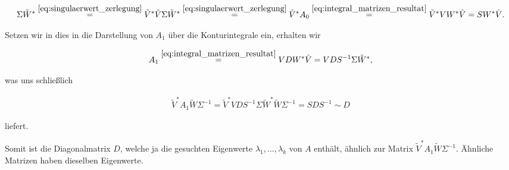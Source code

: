 \begin{align*}
    \Sigma \tilde W^\ast
    \stackrel
    {\eqref{eq:singulaerwert_zerlegung}}{=}
    \tilde V^\ast \tilde V \Sigma \tilde W^\ast
    \stackrel
    {
        \eqref{eq:singulaerwert_zerlegung}
    }{=}
    \tilde V^\ast A_0
    \stackrel
    {
        \eqref{eq:integral_matrizen_resultat}
    }{=}
    \tilde V^\ast V W^\ast \hat V
    =
    S W^\ast \hat V.
\end{align*}

Setzen wir in dies in die Darstellung von $A_1$ über die Konturintegrale ein, erhalten wir

\begin{align*}
    A_1
    \stackrel
    {
        \eqref{eq:integral_matrizen_resultat}
    }{=}
    V D W^\ast \hat V
    =
    V D S^{-1} \Sigma \tilde W^\ast,
\end{align*}

was uns schließlich

\begin{align*}
    \tilde V^\ast A_1 \tilde W \Sigma^{-1}
    =
    \tilde V^\ast V D S^{-1} \Sigma \tilde W^\ast \tilde W \Sigma^{-1}
    =
    S D S^{-1}
    \sim
    D
\end{align*}

liefert.

Somit ist die Diagonalmatrix $D$, welche ja die gesuchten Eigenwerte $\lambda_1, \dots, \lambda_k$ von $A$ enthält, ähnlich zur Matrix $\tilde V^\ast A_1 \tilde W \Sigma^{-1}$.
Ähnliche Matrizen haben dieselben Eigenwerte.
